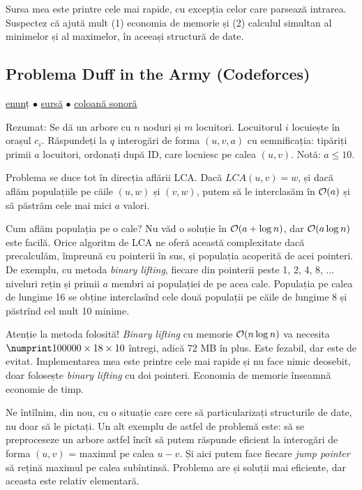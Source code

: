 \documentclass[../main.tex]{subfiles}
\begin{document}
Sursa mea este printre cele mai rapide, cu excepția celor care parsează intrarea. Suspectez că ajută mult (1) economia de memorie și (2) calculul simultan al minimelor și al maximelor, în aceeași structură de date.

\subsection{Problema Duff in the Army (Codeforces)}
\label{problem:duff-in-the-army}

\href{https://codeforces.com/contest/587/problem/C}{enunț}
$\bullet$
\hyperref[code:duff-in-the-army]{sursă}
$\bullet$
\href{https://www.youtube.com/watch?v=EIxsPBbZ_b8}{coloană sonoră} 

Rezumat: Se dă un arbore cu $n$ noduri și $m$ locuitori. Locuitorul $i$ locuiește în orașul $c_i$. Răspundeți la $q$ interogări de forma $(u, v, a)$ cu semnificația: tipăriți primii $a$ locuitori, ordonați după ID, care locuiesc pe calea $(u, v)$. Notă: $a \leq 10$.

Problema se duce tot în direcția aflării LCA. Dacă $LCA(u,v)=w$, și dacă aflăm populațiile pe căile $(u, w)$ și $(v, w)$, putem să le interclasăm în $\mathcal{O}(a)$ și să păstrăm cele mai mici $a$ valori.

Cum aflăm populația pe o cale? Nu văd o soluție în $\mathcal{O}(a + \log n)$, dar $\mathcal{O}(a \log n)$ este facilă. Orice algoritm de LCA ne oferă această complexitate dacă precalculăm, împreună cu pointerii în sus, și populația acoperită de acei pointeri. De exemplu, cu metoda \textit{binary lifting}, fiecare din pointerii peste 1, 2, 4, 8, ... niveluri rețin și primii $a$ membri ai populației de pe acea cale. Populația pe calea de lungime 16 se obține interclasînd cele două populații pe căile de lungime 8 și păstrînd cel mult 10 minime.

Atenție la metoda folosită! \textit{Binary lifting} cu memorie $\mathcal{O}(n \log n)$ va necesita $\np{100000} \times 18 \times 10$ întregi, adică 72 MB în plus. Este fezabil, dar este de evitat. Implementarea mea este printre cele mai rapide și nu face nimic deosebit, doar folosește \textit{binary lifting} cu doi pointeri. Economia de memorie înseamnă economie de timp.

Ne întîlnim, din nou, cu o situație care cere să particularizați structurile de date, nu doar să le pictați. Un alt exemplu de astfel de problemă este: să se preproceseze un arbore astfel încît să putem răspunde eficient la interogări de forma $(u,v)$ = maximul pe calea $u-v$. Și aici putem face fiecare \textit{jump pointer} să rețină maximul pe calea subîntinsă. Problema are și soluții mai eficiente, dar aceasta este relativ elementară.
\end{document}
